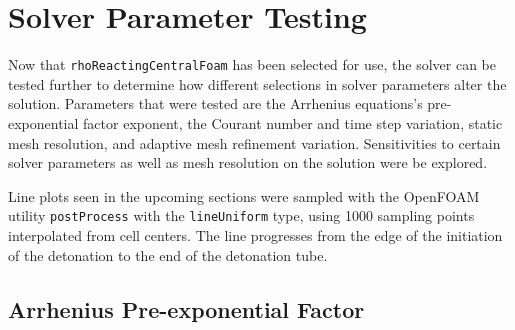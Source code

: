 \chapter{Solver Parameter Testing}
\label{solvtestchap}







Now that \verb|rhoReactingCentralFoam| has been selected for use, the solver can be tested further to determine how different selections in solver parameters alter the solution. Parameters that were tested are the Arrhenius equations's pre-exponential factor exponent, the Courant number and time step variation, static mesh resolution, and adaptive mesh refinement variation. Sensitivities to certain solver parameters as well as mesh resolution on the solution were be explored. 


Line plots seen in the upcoming sections were sampled with the OpenFOAM utility \verb|postProcess| with the \verb|lineUniform| type, using 1000 sampling points interpolated from cell centers. The line progresses from the edge of the initiation of the detonation to the end of the detonation tube. 


\section{Arrhenius Pre-exponential Factor}
\label{sec:a}

